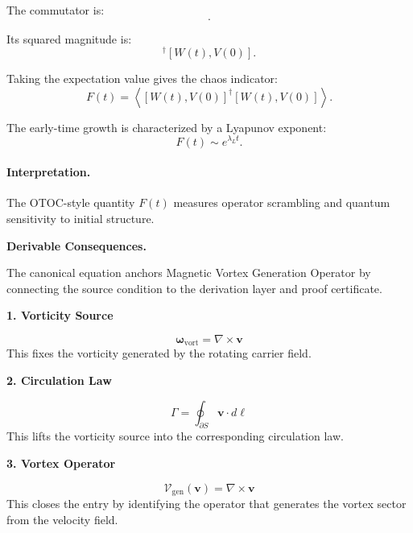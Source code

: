 The commutator is:
\begin{equation}
[W(t),V(0)] .
\end{equation}

Its squared magnitude is:
\begin{equation}
[W(t),V(0)]^\dagger[W(t),V(0)] .
\end{equation}

Taking the expectation value gives the chaos indicator:
\begin{equation}
\boxed{
F(t)
=
\left\langle
[W(t),V(0)]^\dagger
[W(t),V(0)]
\right\rangle .
}
\end{equation}

The early-time growth is characterized by a Lyapunov exponent:
\begin{equation}
F(t)\sim e^{\lambda_L t}.
\end{equation}

\paragraph{Interpretation.}
The OTOC-style quantity $F(t)$ measures operator scrambling and quantum sensitivity to initial structure.

\par\vspace{0.35em}
\noindent\textbf{Derivable Consequences.}\quad
\begingroup
\footnotesize
\raggedright
The canonical equation anchors Magnetic Vortex Generation Operator by connecting the source condition to the derivation layer and proof certificate.
\par\endgroup

\noindent\textbf{1. Vorticity Source}\par
\[
\boldsymbol{\omega}_{\mathrm{vort}}=\nabla\times\mathbf{v}
\]
\noindent This fixes the vorticity generated by the rotating carrier field.\par
\noindent\textbf{2. Circulation Law}\par
\[
\Gamma=\oint_{\partial S}\mathbf{v}\cdot d\boldsymbol{\ell}
\]
\noindent This lifts the vorticity source into the corresponding circulation law.\par
\noindent\textbf{3. Vortex Operator}\par
\[
\mathcal{V}_{\mathrm{gen}}(\mathbf{v})=\nabla\times\mathbf{v}
\]
\noindent This closes the entry by identifying the operator that generates the vortex sector from the velocity field.\par

